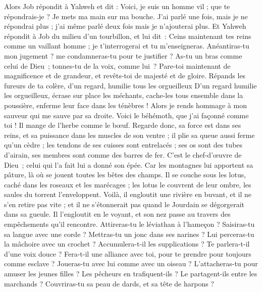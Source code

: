 \begin{multicols}{2}
{
Alors Job répondit à Yahweh et dit :
Voici, je suis un homme vil ; que te répondrais-je ? Je mets ma main sur ma bouche.
J'ai parlé une fois, mais je ne répondrai plus ; j'ai même parlé deux fois mais je n'ajouterai plus.
\VerseOne{}Et Yahweh répondit à Job du milieu d'un tourbillon, et lui dit :
Ceins maintenant tes reins comme un vaillant homme ; je t'interrogerai et tu m'enseigneras.
Anéantiras-tu mon jugement ? me condamneras-tu pour te justifier ?
As-tu un bras comme celui de Dieu ; tonnes-tu de la voix, comme lui ?
Pare-toi maintenant de magnificence et de grandeur, et revêts-toi de majesté et de gloire.
Répands les fureurs de ta colère, d'un regard, humilie tous les orgueilleux
D'un regard humilie les orgueilleux, écrase sur place les méchants,
cache-les tous ensemble dans la poussière, enferme leur face dans les ténèbres !
Alors je rends hommage à mon sauveur qui me sauve par sa droite.
Voici le béhémoth, que j'ai façonné comme toi ! Il mange de l'herbe comme le bœuf.
Regarde donc, sa force est dans ses reins, et sa puissance dans les muscles de son ventre ;
il plie sa queue aussi ferme qu'un cèdre ; les tendons de ses cuisses sont entrelacés ;
ses os sont des tubes d'airain, ses membres sont comme des barres de fer.
C’est le chef-d’œuvre de Dieu ; celui qui l’a fait lui a donné son épée.
Car les montagnes lui apportent sa pâture, là où se jouent toutes les bêtes des champs.
Il se couche sous les lotus, caché dans les roseaux et les marécages ;
les lotus le couvrent de leur ombre, les saules du torrent l'enveloppent.
Voilà, il engloutit une rivière en buvant, et il ne s'en retire pas vite ; et il ne s'étonnerait pas quand le Jourdain se dégorgerait dans sa gueule. 
Il l'engloutit en le voyant, et son nez passe au travers des empêchements qu'il rencontre.  
Attireras-tu le léviathan à l'hameçon ? Saisiras-tu sa langue avec une corde ?
Mettras-tu un jonc dans ses narines ? Lui perceras-tu la mâchoire avec un crochet ?
Accumulera-t-il les supplications ? Te parlera-t-il d'une voix douce ?
Fera-t-il une alliance avec toi, pour te prendre pour toujours comme esclave ?
Joueras-tu avec lui comme avec un oiseau ? L'attacheras-tu pour amuser les jeunes filles ?
Les pêcheurs en trafiquent-ils ? Le partagent-ils entre les marchands ?
Couvriras-tu sa peau de dards, et sa tête de harpons ?
}
\end{multicols}
